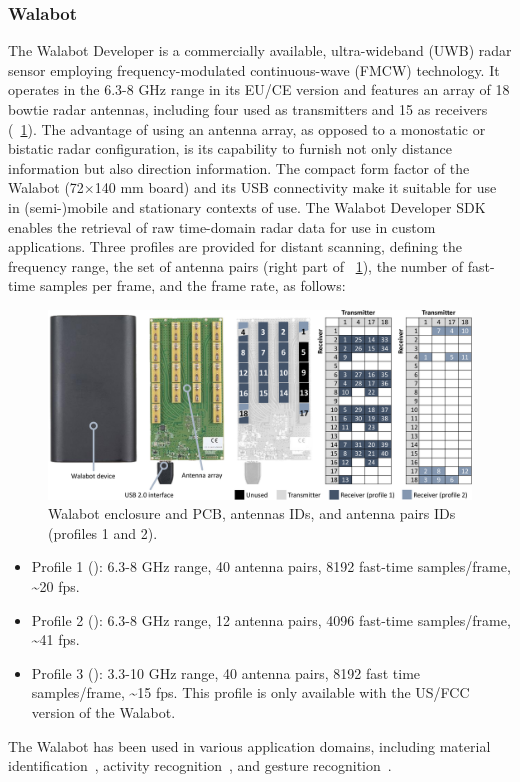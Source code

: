 \subsubsection{Walabot}
The Walabot Developer is a commercially available, ultra-wideband (UWB) radar sensor employing frequency-modulated continuous-wave (FMCW) technology. It operates in the 6.3-8 GHz range in its EU/CE version and features an array of 18 bowtie radar antennas, including four used as transmitters and 15 as receivers (\fig~\ref{fig:radar-experiments:walabot}). The advantage of using an antenna array, as opposed to a monostatic or bistatic radar configuration, is its capability to furnish not only distance information but also direction information.
The compact form factor of the Walabot (72$\times$140 mm board) and its USB connectivity make it suitable for use in (semi-)mobile and stationary contexts of use. 
The Walabot Developer SDK enables the retrieval of raw time-domain radar data for use in custom applications. Three profiles are provided for distant scanning, defining the frequency range, the set of antenna pairs (right part of \fig~\ref{fig:radar-experiments:walabot}), the number of fast-time samples per frame, and the frame rate, as follows:
\begin{figure}[!b]
    \vspace{-4pt}
    \centering
    \includegraphics[width=\linewidth]{Figures/RadarExperiments/Sensors/walabot.pdf}
    \vspace{-16pt}
    \caption{Walabot enclosure and PCB, antennas IDs, and antenna pairs IDs (profiles 1 and 2).}
    \label{fig:radar-experiments:walabot}
\end{figure}
\begin{itemize}
    \item Profile 1 (): 6.3-8 GHz range, 40 antenna pairs, 8192 fast-time samples/frame, \textasciitilde 20 fps.
    \item Profile 2 (): 6.3-8 GHz range, 12 antenna pairs, 4096 fast-time samples/frame, \textasciitilde 41 fps.
    \item Profile 3 (): 3.3-10 GHz range, 40 antenna pairs, 8192 fast time samples/frame, \textasciitilde 15 fps. This profile is only available with the US/FCC version of the Walabot.
\end{itemize}
The Walabot has been used in various application domains, including material identification~\cite{Agresti:2019}, activity recognition~\cite{Avrahami:2018, Zhu:2018}, and gesture recognition~\cite{Zhang:2021}.



